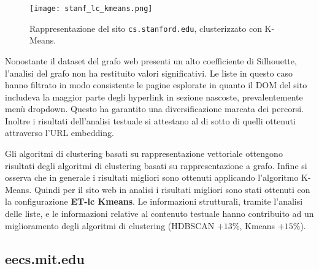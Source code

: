 \begin{figure}[ht!]
	\centering
	\texttt{[image: stanf\_lc\_kmeans.png]}
	\caption{Rappresentazione del sito \texttt{cs.stanford.edu}, clusterizzato con K-Means.}
	\label{lc_embText_km}
\end{figure}

Nonostante il dataset del grafo web presenti un alto coefficiente di Silhouette, l'analisi del grafo non ha restituito  valori significativi. Le liste in questo caso hanno filtrato in modo consistente le pagine esplorate in quanto il DOM del sito includeva la maggior parte degli hyperlink in sezione nascoste, prevalentemente menù dropdown. Questo ha garantito una diversificazione marcata dei percorsi. Inoltre i risultati dell'analisi testuale si attestano al di sotto di quelli ottenuti attraverso l'URL embedding. 

Gli algoritmi di clustering basati su rappresentazione vettoriale ottengono risultati degli algoritmi di clustering basati su rappresentazione a grafo.
Infine si osserva che in generale i risultati migliori sono ottenuti applicando l'algoritmo K-Means.
Quindi per il sito web in analisi i risultati migliori sono stati ottenuti con la configurazione \textbf{ET-lc Kmeans}. 
Le informazioni strutturali, tramite l'analisi delle liste, e le informazioni relative al contenuto testuale hanno contribuito ad un miglioramento degli algoritmi di clustering (HDBSCAN $+13\%$, Kmeans $+15\%$).

\subsection{eecs.mit.edu}

